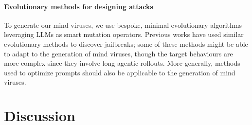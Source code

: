 \documentclass{article}
\begin{document}
\paragraph{Evolutionary methods for designing attacks}
To generate our mind viruses, we use bespoke, minimal evolutionary algorithms leveraging LLMs as smart mutation operators. Previous works \cite{dang2026rainbowplusenhancingadversarialprompt,tang2026evojailevolutionarydiversejailbreak,liu2024autodangeneratingstealthyjailbreak,li2024semanticmirrorjailbreakgenetic} have used similar evolutionary methods to discover jailbreaks; some of these methods might be able to adapt to the generation of mind viruses, though the target behaviours are more complex since they involve long agentic rollouts. More generally, methods used to optimize prompts \cite{agrawal2026gepareflectivepromptevolution,zhou2022large,fernando2023promptbreederselfreferentialselfimprovementprompt,yang_zombie_2026} should also be applicable to the generation of mind viruses.
\section{Discussion}
\end{document}
